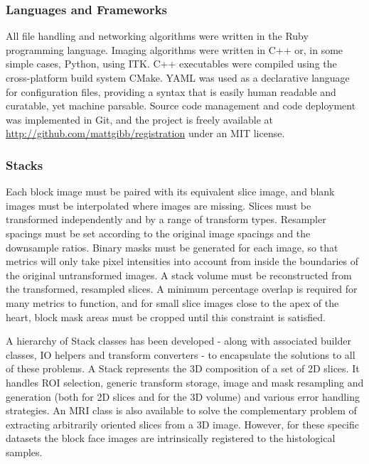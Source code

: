 		\subsubsection{Languages and Frameworks} %
		\label{ssub:languages_and_frameworks}
      All file handling and networking algorithms were written in the Ruby programming language. Imaging algorithms were written in C++ or, in some simple cases, Python, using ITK. C++ executables were compiled using the cross-platform build system CMake. YAML was used as a declarative language for configuration files, providing a syntax that is easily human readable and curatable, yet machine parsable. Source code management and code deployment was implemented in Git, and the project is freely available at \url{http://github.com/mattgibb/registration} under an MIT license.
		
    \subsubsection{Stacks} %
    \label{ssub:stacks}
      Each block image must be paired with its equivalent slice image, and blank images must be interpolated where images are missing. Slices must be transformed independently and by a range of transform types. Resampler spacings must be set according to the original image spacings and the downsample ratios. Binary masks must be generated for each image, so that metrics will only take pixel intensities into account from inside the boundaries of the original untransformed images. A stack volume must be reconstructed from the transformed, resampled slices. A minimum percentage overlap is required for many metrics to function, and for small slice images close to the apex of the heart, block mask areas must be cropped until this constraint is satisfied.
	  	
      A hierarchy of Stack classes has been developed - along with associated builder classes, IO helpers and transform converters - to encapsulate the solutions to all of these problems. A Stack represents the 3D composition of a set of 2D slices. It handles ROI selection, generic transform storage, image and mask resampling and generation (both for 2D slices and for the 3D volume) and various error handling strategies. An MRI class is also available to solve the complementary problem of extracting arbitrarily oriented slices from a 3D image. However, for these specific datasets the block face images are intrinsically registered to the histological samples.
    
